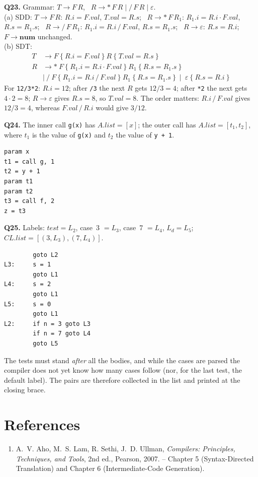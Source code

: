 \documentclass[11pt,a4paper]{article}
\newcommand{\at}[2]{\ensuremath{#1.\mathit{#2}}}
\begin{document}
\textbf{Q23.} Grammar: $T\to F\,R$, \ $R\to *\,F\,R\mid /\,F\,R\mid\varepsilon$.\\
(a) SDD: $T\to F\,R$: $\at{R}{i}=\at{F}{val}$, $\at{T}{val}=\at{R}{s}$; \ $R\to *\,F\,R_1$: $\at{R_1}{i}=\at{R}{i}\cdot\at{F}{val}$, $\at{R}{s}=\at{R_1}{s}$; \ $R\to /\,F\,R_1$: $\at{R_1}{i}=\at{R}{i}\,/\,\at{F}{val}$, $\at{R}{s}=\at{R_1}{s}$; \ $R\to\varepsilon$: $\at{R}{s}=\at{R}{i}$; \ $F\to\mathbf{num}$ unchanged.\\
(b) SDT:
\begin{align*}
T &\to F\ \{\ \at{R}{i}=\at{F}{val}\ \}\ R\ \{\ \at{T}{val}=\at{R}{s}\ \}\\
R &\to *\ F\ \{\ \at{R_1}{i}=\at{R}{i}\cdot\at{F}{val}\ \}\ R_1\ \{\ \at{R}{s}=\at{R_1}{s}\ \}\\
  &\mid\ /\ F\ \{\ \at{R_1}{i}=\at{R}{i}\,/\,\at{F}{val}\ \}\ R_1\ \{\ \at{R}{s}=\at{R_1}{s}\ \}\ \mid\ \varepsilon\ \{\ \at{R}{s}=\at{R}{i}\ \}
\end{align*}
For \texttt{12/3*2}: $R.i=12$; after \texttt{/3} the next $R$ gets $12/3=4$; after \texttt{*2} the next gets $4\cdot2=8$; $R\to\varepsilon$ gives $R.s=8$, so $T.val=8$. The order matters: $R.i\,/\,F.val$ gives $12/3=4$, whereas $F.val\,/\,R.i$ would give $3/12$.

\textbf{Q24.} The inner call \texttt{g(x)} has $A.\mathit{list}=[x]$; the outer call has $A.\mathit{list}=[t_1,t_2]$, where $t_1$ is the value of \texttt{g(x)} and $t_2$ the value of \texttt{y + 1}.
\begin{lstlisting}
param x
t1 = call g, 1
t2 = y + 1
param t1
param t2
t3 = call f, 2
z = t3
\end{lstlisting}

\textbf{Q25.} Labels: $\mathit{test}=L_2$, case~3 $=L_3$, case~7 $=L_4$, $L_d=L_5$; $\mathit{CL}.\mathit{list}=[(3,L_3),(7,L_4)]$.
\begin{lstlisting}
        goto L2
L3:     s = 1
        goto L1
L4:     s = 2
        goto L1
L5:     s = 0
        goto L1
L2:     if n = 3 goto L3
        if n = 7 goto L4
        goto L5
\end{lstlisting}
The tests must stand \emph{after} all the bodies, and while the cases are parsed the compiler does not yet know how many cases follow (nor, for the last test, the default label). The pairs are therefore collected in the list and printed at the closing brace.

\section*{References}
\begin{enumerate}[nosep]
\item A.~V. Aho, M.~S. Lam, R. Sethi, J.~D. Ullman, \emph{Compilers: Principles, Techniques, and Tools}, 2nd ed., Pearson, 2007. -- Chapter 5 (Syntax-Directed Translation) and Chapter 6 (Intermediate-Code Generation).
\end{enumerate}
\end{document}
